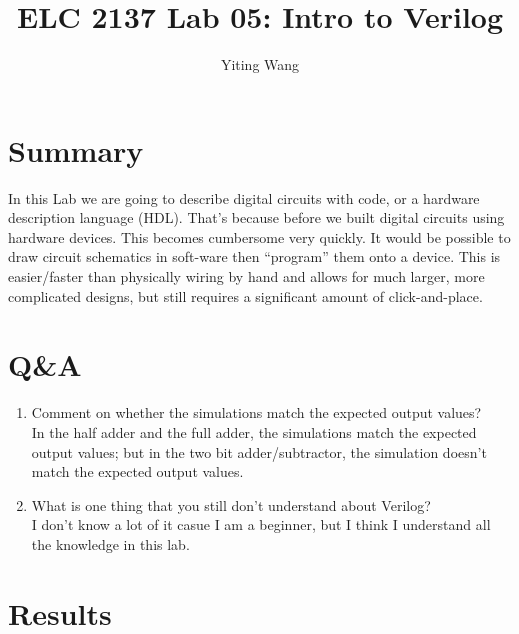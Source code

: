 \documentclass[11pt]{article}
\begin{document}
\title{ELC 2137 Lab 05: Intro to Verilog}
\author{Yiting Wang}

\maketitle


\section*{Summary}

In this Lab we are going to describe digital circuits with code,  or a  hardware description language  (HDL). That's because before we built digital circuits using hardware devices.  This becomes cumbersome very quickly.  It would be possible to draw circuit schematics in soft-ware then “program” them onto a device.  This is easier/faster than physically wiring by hand and allows for much larger, more complicated designs, but still requires a significant amount of click-and-place. \\



\section*{Q\&A}

\begin{enumerate}
	\item Comment on whether the simulations match the expected output values? \\
	In the half adder and the full adder, the simulations match the expected output values; but in the two bit adder/subtractor, the simulation doesn't match the expected output values. \\
	\item What is one thing that you still don’t understand about Verilog? \\
	I don't know a lot of it casue I am a beginner, but I think I understand all the knowledge in this lab. \\
\end{enumerate}



\section*{Results}
\end{document}
